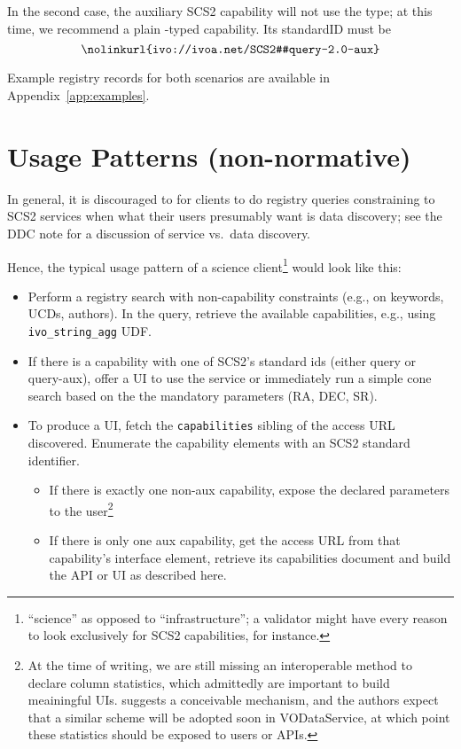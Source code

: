 \documentclass[11pt,a4paper]{ivoa}
\begin{document}
In the second case, the auxiliary SCS2 capability will not use the
 type; at this time, we recommend a plain
-typed capability.  Its standardID must be
$$
\hbox{\nolinkurl{ivo://ivoa.net/SCS2#query-2.0-aux}}
$$

Example registry records for both scenarios are available in
Appendix~\ref{app:examples}.


\appendix
\section{Usage Patterns (non-normative)}

In general, it is discouraged to for clients to do registry queries
constraining to SCS2 services when what their users presumably want is
data discovery; see the DDC note \citet{2019ivoa.spec.0520D} for a
discussion of service vs.~data discovery.

Hence, the typical usage pattern of a science
client\footnote{``science'' as opposed to ``infrastructure''; a
validator might have every reason to look exclusively for SCS2
capabilities, for instance.} would look like this:

\begin{itemize}
\item Perform a registry search with non-capability constraints (e.g.,
on keywords, UCDs, authors).  In the query, retrieve the available
capabilities, e.g., using \verb|ivo_string_agg| UDF.

\item If there is a capability with one of SCS2's standard ids (either
query or query-aux), offer a UI to use the service or immediately run a
simple cone search based on the the mandatory parameters (RA, DEC, SR).

\item To produce a UI, fetch the \texttt{capabilities} sibling of the
access URL discovered.  Enumerate the capability elements with an SCS2
standard identifier.

\begin{itemize}
\item If there is exactly one non-aux capability, expose
the declared parameters to the user\footnote{At the time of writing, we
are still missing an interoperable method to declare column statistics,
which admittedly are important to build meainingful UIs.
\citet{note:colstatnote} suggests a conceivable mechanism, and the
authors expect that a similar scheme will be adopted soon in
VODataService, at which point these statistics should be exposed to
users or APIs.}

\item If there is only one aux capability, get the access URL from that
capability's interface element, retrieve its capabilities document and
build the API or UI as described here.
\end{itemize}
\end{itemize}
\end{document}
